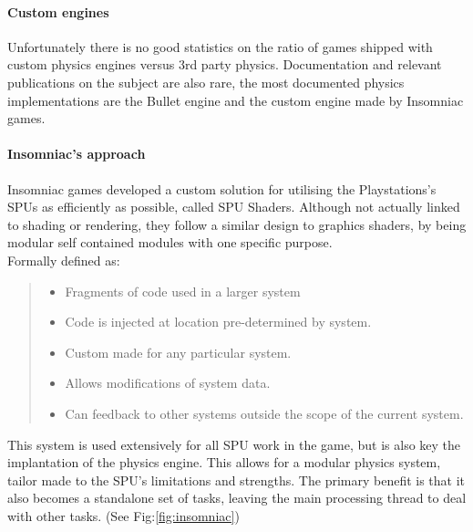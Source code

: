 \documentclass[conference]{acmsiggraph}
\begin{document}
\paragraph{Custom engines}
Unfortunately there is no good statistics on the ratio of games shipped with custom physics engines versus 3rd party physics. 
Documentation and relevant publications on the subject are also rare, the most documented physics implementations are the Bullet engine and the custom engine made by Insomniac games.

\paragraph{Insomniac's approach}

Insomniac games developed a custom solution for utilising the Playstations's SPUs as efficiently as possible, called SPU Shaders. Although not actually linked to shading or rendering, they follow a similar design to graphics shaders, by being modular self contained modules with one specific purpose.\\
Formally defined as:
\begin{quote}
\begin{itemize}
  \item Fragments of code used in a larger system
  \item Code is injected at location pre-determined by
system.
  \item Custom made for any particular system.
  \item Allows modifications of system data.
  \item Can feedback to other systems outside the scope of the current system.
\end{itemize}
\cite{spushaders}
\end{quote}

This system is used extensively for all SPU work in the game, but is also key the implantation of the physics engine. This allows for a modular physics system, tailor made to the SPU's limitations and strengths. The primary benefit is that it also becomes a standalone set of tasks, leaving the main processing thread to deal with other tasks.
(See Fig:\ref{fig:insomniac})
\end{document}
